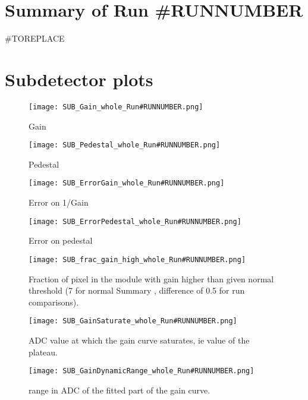 \documentclass[a4paper,10pt]{article}
\begin{document}
\tableofcontents

\clearpage

\section{Summary of Run #RUNNUMBER}

#TOREPLACE

\clearpage

\section{Subdetector plots\label{sec:subdetector}}

\begin{figure}[htp]
 \centering
\texttt{[image: SUB\_Gain\_whole\_Run\#RUNNUMBER.png]}
\caption{Gain}
\end{figure}


\begin{figure}[htp]
 \centering
\texttt{[image: SUB\_Pedestal\_whole\_Run\#RUNNUMBER.png]}
\caption{Pedestal}
\end{figure}


\begin{figure}[htp]
 \centering
\texttt{[image: SUB\_ErrorGain\_whole\_Run\#RUNNUMBER.png]}
\caption{Error on 1/Gain}
\end{figure}


\begin{figure}[htp]
 \centering
\texttt{[image: SUB\_ErrorPedestal\_whole\_Run\#RUNNUMBER.png]}
\caption{Error on pedestal}
\end{figure}

\begin{figure}[htp]
 \centering
  \texttt{[image: SUB\_frac\_gain\_high\_whole\_Run\#RUNNUMBER.png]}
\caption{Fraction of pixel in the module with gain higher than given normal threshold (7 for normal Summary , difference of 0.5
for run comparisons).}
\end{figure}

\begin{figure}[htp]
 \centering
  \texttt{[image: SUB\_GainSaturate\_whole\_Run\#RUNNUMBER.png]}
\caption{ADC value at which the gain curve saturates, ie value of the plateau.}
\end{figure}

\begin{figure}[htp]
 \centering
  \texttt{[image: SUB\_GainDynamicRange\_whole\_Run\#RUNNUMBER.png]}
\caption{range in ADC of the fitted part of the gain curve.}
\end{figure}
\end{document}

